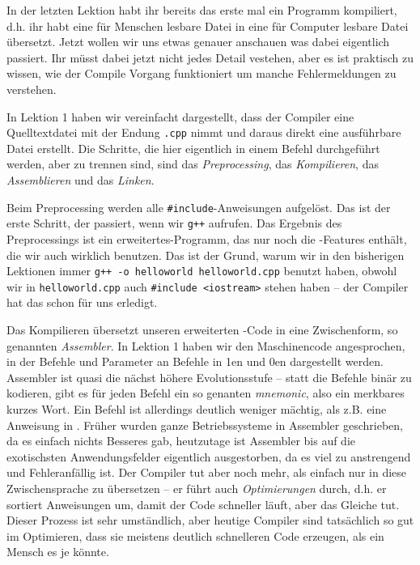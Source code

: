 
In der letzten Lektion habt ihr bereits das erste mal ein Programm kompiliert,
d.h. ihr habt eine für Menschen lesbare Datei in eine für Computer lesbare Datei 
übersetzt. Jetzt wollen wir uns etwas genauer anschauen was dabei eigentlich passiert. 
Ihr müsst dabei jetzt nicht jedes Detail vestehen, aber es ist praktisch zu
wissen, wie der Compile Vorgang funktioniert um manche Fehlermeldungen zu verstehen.

In Lektion 1 haben wir vereinfacht dargestellt, dass der Compiler eine
Quelltextdatei mit der Endung \texttt{.cpp} nimmt und daraus direkt eine
ausführbare Datei erstellt. Die Schritte, die hier eigentlich in einem Befehl
durchgeführt werden, aber zu trennen sind, sind das \emph{Preprocessing}, das \emph{Kompilieren}, das
\emph{Assemblieren} und das \emph{Linken}.

Beim Preprocessing werden alle \texttt{\#include}-Anweisungen aufgelöst.
Das ist der erste Schritt, der passiert, wenn wir \texttt{g++} 
aufrufen. Das Ergebnis des Preprocessings ist ein erweitertes\Cpp-Programm, das nur noch die
\Cpp-Features enthält, die wir auch wirklich benutzen. Das ist der Grund, warum wir
in den bisherigen Lektionen immer \texttt{g++ -o helloworld helloworld.cpp} benutzt haben,
obwohl wir in \texttt{helloworld.cpp} auch \texttt{\#include <iostream>} stehen haben
-- der Compiler hat das schon für uns erledigt.

Das Kompilieren übersetzt unseren erweiterten \Cpp-Code in eine Zwischenform, so genannten
\emph{Assembler}. In Lektion 1 haben wir den Maschinencode angesprochen, in der
Befehle und Parameter an Befehle in 1en und 0en dargestellt werden. Assembler
ist quasi die nächst höhere Evolutionsstufe -- statt die Befehle binär zu
kodieren, gibt es für jeden Befehl ein so genanten \emph{mnemonic}, also ein
merkbares kurzes Wort. Ein Befehl ist allerdings deutlich weniger mächtig, als
z.B. eine Anweisung in \Cpp. Früher wurden ganze Betriebssysteme in Assembler
geschrieben, da es einfach nichts Besseres gab, heutzutage ist Assembler bis
auf die exotischsten Anwendungsfelder eigentlich ausgestorben, da es viel zu
anstrengend und Fehleranfällig ist. Der Compiler tut aber noch mehr, als
einfach nur in diese Zwischensprache zu übersetzen -- er führt auch
\emph{Optimierungen} durch, d.h. er sortiert Anweisungen um, damit der Code
schneller läuft, aber das Gleiche tut. Dieser Prozess ist sehr umständlich,
aber heutige Compiler sind tatsächlich so gut im Optimieren, dass sie meistens
deutlich schnelleren Code erzeugen, als ein Mensch es je könnte.


